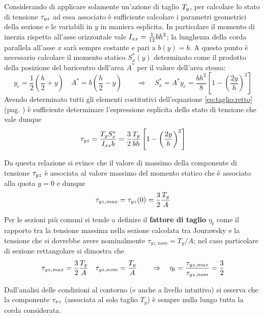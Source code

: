		
		Considerando di applicare solamente un'azione di taglio $T_y$, per calcolare lo stato di tensione $\tau_{yz}$ ad essa associato è sufficiente calcolare i parametri geometrici della sezione e le variabili in $y$ in maniera esplicita. In particolare il momento di inerzia rispetto all'asse orizzontale vale $I_{xx} = \frac 1 {12}bh^3$; la lunghezza della corda parallela all'asse $x$ sarà sempre costante e pari a $b(y) = b$. A questo punto è necessario calcolare il momento statico $S^*_x(y)$ determinato come il prodotto della posizione del baricentro dell'area $A^*$ per il valore dell'area stessa:
		\[y_c = \frac 12\left( \frac h 2 + y\right) \quad A^* = b \left(\frac h 2 - y \right) \qquad \Rightarrow \quad S_x^* = A^* y_c = \frac{bh^2}{8} \left[ 1 - \left(\frac{2y}{h}\right)^2 \right]\]
		Avendo determinato tutti gli elementi costitutivi dell'equazione \ref{eq:taglio:retto} (pag. \pageref{eq:taglio:retto}) è sufficiente determinare l'espressione esplicita dello stato di tensione che vale dunque
		\begin{equation}
			\tau_{yz} = \frac{T_y S_x^*}{I_{xx} b} = \frac 3 2 \frac {T_y}{bh}  \left[ 1 - \left(\frac{2y}{h}\right)^2 \right]
		\end{equation}
		
		Da questa relazione si evince che il valore di massimo della componente di tensione $\tau_{yz}$ è associata al valore massimo del momento statico che è associato alla quota $y=0$ e dunque
		\[\tau_{yz,max} = \tau_{yz}(0) = \frac 3 2 \frac {T_y} A\] 
		\begin{concetto}
			Per le sezioni più comuni si tende a definire il \textbf{fattore di taglio} $\eta_t$ come il rapporto tra la tensione massima nella sezione calcolata tra Jourawsky e la tensione che si dovrebbe avere nominalmente $\tau_{yz,nom} = T_y/A$; nel caso particolare di sezione rettangolare si dimostra che
			\begin{equation} \label{eq:taglio:fattore}
				\tau_{yz,max} = \frac 3 2 \frac {T_y} A \quad \tau_{yz,nom} = \frac {T_y} A \qquad \Rightarrow \quad \eta_t = \frac{\tau_{yz,max}}{\tau_{yz,nom}} = \frac 3 2
			\end{equation}
		\end{concetto}
		
		Dall'analisi delle condizioni al contorno (e anche a livello intuitivo) si osserva che la componente $\tau_{xz}$ (associata al solo taglio $T_y$) è sempre nulla lungo tutta la corda considerata.
		
